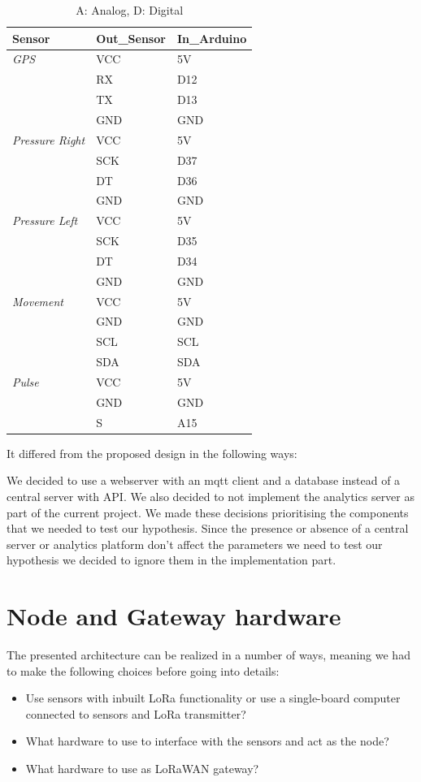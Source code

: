 \begin{table}[h]
	\begin{tabular}{l|ll}
		\textbf{Sensor} & \textbf{Out\_Sensor} & \textbf{In\_Arduino} \\\hline
		\textit{GPS} & VCC & 5V \\
		& RX & D12 \\
		& TX & D13 \\
		& GND & GND \\\hline
		\textit{Pressure Right} & VCC & 5V \\
		& SCK & D37 \\
		& DT & D36 \\
		& GND & GND \\\hline
		\textit{Pressure Left} & VCC & 5V \\
		& SCK & D35 \\
		& DT & D34 \\
		& GND & GND \\\hline
		\textit{Movement} & VCC & 5V \\
		& GND & GND \\
		& SCL & SCL \\
		& SDA & SDA \\\hline
		\textit{Pulse} & VCC & 5V \\
		& GND & GND \\
		& S & A15 
	\end{tabular}
	\label{tab:blueprint}
	\caption[Blueprint connections node]{A: Analog, D: Digital}
\end{table}

It differed from the proposed design in the following ways:

We decided to use a webserver with an mqtt client and a database instead of a central server with API. We also decided to not implement the analytics server as part of the current project. We made these decisions prioritising the components that we needed to test our hypothesis. Since the presence or absence of a central server or analytics platform don't affect the parameters we need to test our hypothesis we decided to ignore them in the implementation part.


\section{Node and Gateway hardware}
	The presented architecture can be realized in a number of ways, meaning we had to make the following choices before going into details:

	\begin{itemize}
		\item Use sensors with inbuilt LoRa functionality or use a single-board computer connected to sensors and LoRa transmitter?
		\item What hardware to use to interface with the sensors and act as the node?
		\item What hardware to use as LoRaWAN gateway?
	\end{itemize}


